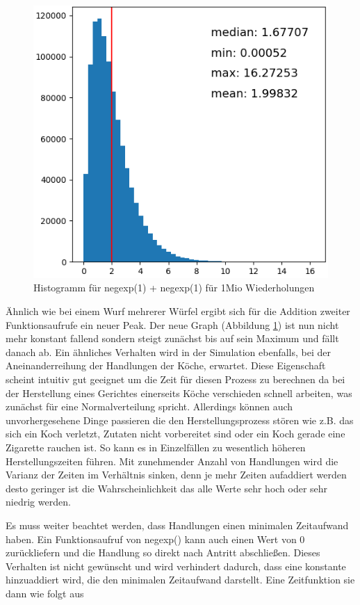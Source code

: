 \begin{figure}[ht]
  \includegraphics[width=1\textwidth]{pics/negexp2.png}
  \caption{Histogramm für negexp(1) + negexp(1) für 1Mio Wiederholungen}
  \label{pic:negexp2}
\end{figure}

Ähnlich wie bei einem Wurf mehrerer Würfel ergibt sich für die Addition zweiter Funktionsaufrufe ein neuer Peak. Der neue Graph (Abbildung \ref{pic:negexp2}) ist nun nicht mehr konstant fallend sondern steigt zunächst bis auf sein Maximum und fällt danach ab. Ein ähnliches Verhalten wird in der Simulation ebenfalls, bei der Aneinanderreihung der Handlungen der Köche, erwartet. Diese Eigenschaft scheint intuitiv gut geeignet um die Zeit für diesen Prozess zu berechnen da bei der Herstellung eines Gerichtes einerseits Köche verschieden schnell arbeiten, was zunächst für eine Normalverteilung spricht. Allerdings können auch unvorhergesehene Dinge passieren die den Herstellungsprozess stören wie z.B. das sich ein Koch verletzt, Zutaten nicht vorbereitet sind oder ein Koch gerade eine Zigarette rauchen ist. So kann es in Einzelfällen zu wesentlich höheren Herstellungszeiten führen. Mit zunehmender Anzahl von Handlungen wird die Varianz der Zeiten im Verhältnis sinken, denn je mehr Zeiten aufaddiert werden desto geringer ist die Wahrscheinlichkeit das alle Werte sehr hoch oder sehr niedrig werden.

Es muss weiter beachtet werden, dass Handlungen einen minimalen Zeitaufwand haben. Ein Funktionsaufruf von negexp() kann auch einen Wert von 0 zurückliefern und die Handlung so direkt nach Antritt abschließen. Dieses Verhalten ist nicht gewünscht und wird verhindert dadurch, dass eine konstante hinzuaddiert wird, die den minimalen Zeitaufwand darstellt. Eine Zeitfunktion sie dann wie folgt aus

